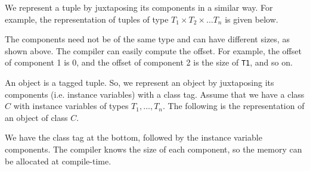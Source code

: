 \documentclass[a4paper, openany]{memoir}
\begin{document}
We represent a tuple by juxtaposing its components in a similar way. For example, the representation of tuples of type $T_1 \times T_2 \times \dots T_n$ is given below.
\begin{figure}[H]
    \centering
\end{figure}
\noindent The components need not be of the same type and can have different sizes, as shown above. The compiler can easily compute the offset. For example, the offset of component 1 is 0, and the offset of component 2 is the size of \texttt{T1}, and so on. 

An object is a tagged tuple. So, we represent an object by juxtaposing its components (i.e. instance variables) with a class tag. Assume that we have a class $C$ with instance variables of types $T_1, \dots, T_n$. The following is the representation of an object of class $C$.
\begin{figure}[H]
    \centering
\end{figure}
\noindent We have the class tag at the bottom, followed by the instance variable components. The compiler knows the size of each component, so the memory can be allocated at compile-time.
\end{document}
